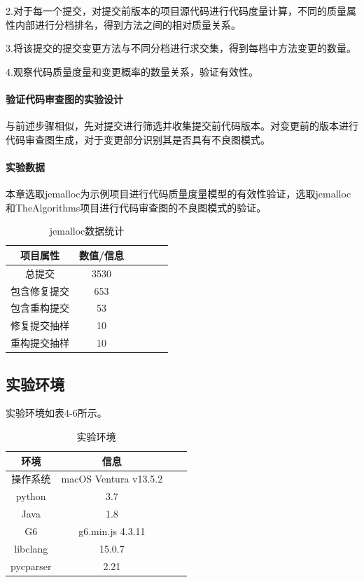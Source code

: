 \noindent 2.对于每一个提交，对提交前版本的项目源代码进行代码度量计算，不同的质量属性内部进行分档排名，得到方法之间的相对质量关系。

\noindent 3.将该提交的提交变更方法与不同分档进行求交集，得到每档中方法变更的数量。

\noindent 4.观察代码质量度量和变更概率的数量关系，验证有效性。

\paragraph{验证代码审查图的实验设计} 

与前述步骤相似，先对提交进行筛选并收集提交前代码版本。对变更前的版本进行代码审查图生成，对于变更部分识别其是否具有不良图模式。


\paragraph{实验数据} 本章选取jemalloc为示例项目进行代码质量度量模型的有效性验证，选取jemalloc和TheAlgorithms项目进行代码审查图的不良图模式的验证。

\begin{table}[htbp]
\caption{jemalloc数据统计}
\vspace{0.5em}\centering\wuhao
\begin{tabular}{cccccc}
\toprule
项目属性 & 数值/信息 \\
\midrule
总提交 & 3530 \\
包含修复提交 & 653  \\
包含重构提交 & 53  \\
修复提交抽样 & 10 \\
重构提交抽样 &  10 \\
\bottomrule
\end{tabular}
\end{table}


\subsection{实验环境}


实验环境如表4-6所示。

\begin{table}[htbp]
\caption{实验环境}
\vspace{0.5em}\centering\wuhao
\begin{tabular}{cccc}
\toprule
    环境 & 信息 \\
\midrule
操作系统 & macOS Ventura v13.5.2  \\
python & 3.7   \\
Java & 1.8   \\
G6 & g6.min.js 4.3.11  \\  
libclang & 15.0.7  \\ 
pycparser & 2.21  \\
\bottomrule
\end{tabular}
\end{table}


